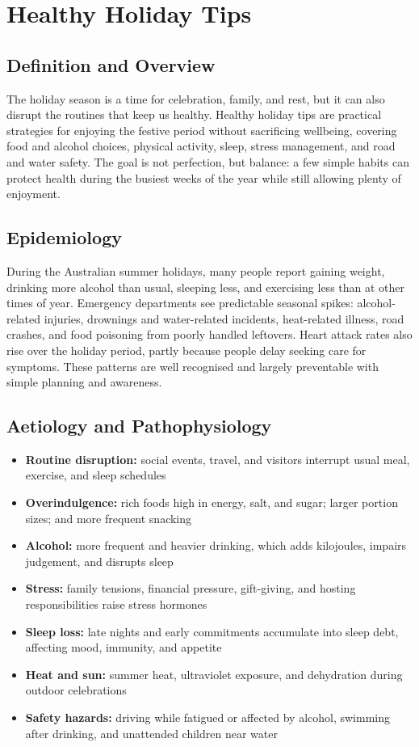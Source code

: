 \chapter{Healthy Holiday Tips}

\section*{Definition and Overview}
The holiday season is a time for celebration, family, and rest, but it can also disrupt the routines that keep us healthy. Healthy holiday tips are practical strategies for enjoying the festive period without sacrificing wellbeing, covering food and alcohol choices, physical activity, sleep, stress management, and road and water safety. The goal is not perfection, but balance: a few simple habits can protect health during the busiest weeks of the year while still allowing plenty of enjoyment.

\section*{Epidemiology}
During the Australian summer holidays, many people report gaining weight, drinking more alcohol than usual, sleeping less, and exercising less than at other times of year. Emergency departments see predictable seasonal spikes: alcohol-related injuries, drownings and water-related incidents, heat-related illness, road crashes, and food poisoning from poorly handled leftovers. Heart attack rates also rise over the holiday period, partly because people delay seeking care for symptoms. These patterns are well recognised and largely preventable with simple planning and awareness.

\section*{Aetiology and Pathophysiology}
\begin{itemize}
    \item \textbf{Routine disruption:} social events, travel, and visitors interrupt usual meal, exercise, and sleep schedules
    \item \textbf{Overindulgence:} rich foods high in energy, salt, and sugar; larger portion sizes; and more frequent snacking
    \item \textbf{Alcohol:} more frequent and heavier drinking, which adds kilojoules, impairs judgement, and disrupts sleep
    \item \textbf{Stress:} family tensions, financial pressure, gift-giving, and hosting responsibilities raise stress hormones
    \item \textbf{Sleep loss:} late nights and early commitments accumulate into sleep debt, affecting mood, immunity, and appetite
    \item \textbf{Heat and sun:} summer heat, ultraviolet exposure, and dehydration during outdoor celebrations
    \item \textbf{Safety hazards:} driving while fatigued or affected by alcohol, swimming after drinking, and unattended children near water
\end{itemize}

